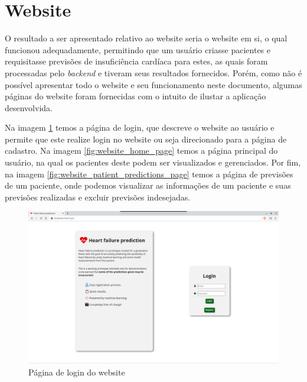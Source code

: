 \section{Website}

O resultado a ser apresentado relativo ao website seria o website em si, o qual funcionou adequadamente, permitindo que um usuário criasse pacientes e requisitasse previsões de insuficiência cardíaca para estes, as quais foram processadas pelo \textit{backend} e tiveram seus resultados fornecidos. Porém, como não é possível apresentar todo o website e seu funcionamento neste documento, algumas páginas do website foram fornecidas com o intuito de ilustar a aplicação desenvolvida.

Na imagem \ref{fig:website_login_page} temos a página de login, que descreve o website ao usuário e permite que este realize login no website ou seja direcionado para a página de cadastro. Na imagem \ref{fig:website_home_page} temos a página principal do usuário, na qual os pacientes deste podem ser visualizados e gerenciados. Por fim, na imagem \ref{fig:website_patient_predictions_page} temos a página de previsões de um paciente, onde podemos visualizar as informações de um paciente e suas previsões realizadas e excluir previsões indesejadas.

\begin{figure}[ht!]
	\centering
  \includegraphics[scale=0.26]{images/website_pagina_login.png}
  \caption{Página de login do website}
  \label{fig:website_login_page}
\end{figure}

